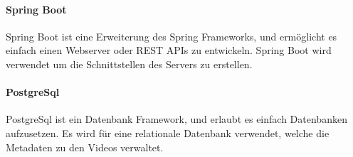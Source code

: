 \paragraph{Spring Boot} \label{par:spring_boot}

Spring Boot ist eine Erweiterung des Spring Frameworks, und ermöglicht es einfach einen Webserver oder REST APIs zu entwickeln. Spring Boot wird verwendet um die Schnittstellen des Servers zu erstellen.

\paragraph{PostgreSql} \label{par:postgre}
PostgreSql ist ein Datenbank Framework, und erlaubt es einfach Datenbanken aufzusetzen. Es wird für eine relationale Datenbank verwendet, welche die Metadaten zu den Videos verwaltet.

\newpage